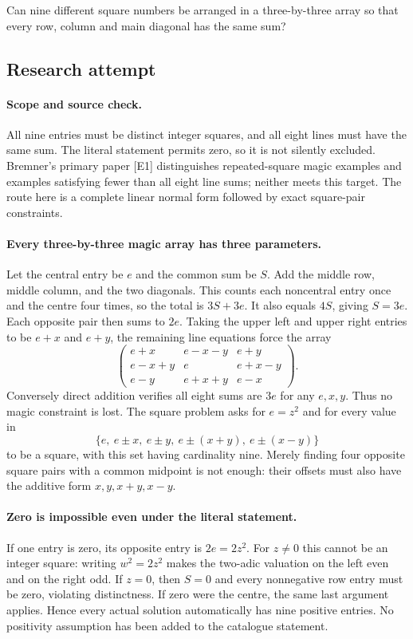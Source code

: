 \documentclass[11pt,a4paper]{article}
\begin{document}
Can nine different square numbers be arranged in a three-by-three array so that every row, column and main diagonal has the same sum?

\subsection{Research attempt}

\paragraph{Scope and source check.}
All nine entries must be distinct integer squares, and all eight lines
must have the same sum. The literal statement permits zero, so it is
not silently excluded. Bremner's primary paper [E1] distinguishes
repeated-square magic examples and examples satisfying fewer than all
eight line sums; neither meets this target. The route here is a complete
linear normal form followed by exact square-pair constraints.

\paragraph{Every three-by-three magic array has three parameters.}
Let the central entry be $e$ and the common sum be $S$. Add the middle
row, middle column, and the two diagonals. This counts each noncentral
entry once and the centre four times, so the total is $3S+3e$.
It also equals $4S$, giving $S=3e$. Each opposite pair then sums to
$2e$. Taking the upper left and upper right entries to be $e+x$ and
$e+y$, the remaining line equations force the array
\[
 \begin{pmatrix}
 e+x&e-x-y&e+y\\
 e-x+y&e&e+x-y\\
 e-y&e+x+y&e-x
 \end{pmatrix}.
\]
Conversely direct addition verifies all eight sums are $3e$ for any
$e,x,y$. Thus no magic constraint is lost. The square problem asks for
$e=z^2$ and for every value in
\[
 \{e,\ e\pm x,\ e\pm y,\ e\pm(x+y),\ e\pm(x-y)\}
\]
to be a square, with this set having cardinality nine. Merely finding
four opposite square pairs with a common midpoint is not enough: their
offsets must also have the additive form $x,y,x+y,x-y$.

\paragraph{Zero is impossible even under the literal statement.}
If one entry is zero, its opposite entry is $2e=2z^2$. For $z\ne0$
this cannot be an integer square: writing $w^2=2z^2$ makes the
two-adic valuation on the left even and on the right odd. If $z=0$,
then $S=0$ and every nonnegative row entry must be zero, violating
distinctness. If zero were the centre, the same last argument applies.
Hence every actual solution automatically has nine positive entries.
No positivity assumption has been added to the catalogue statement.
\end{document}
